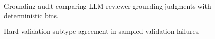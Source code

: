 \begin{table}[h]
\centering
\caption{Grounding audit comparing LLM reviewer grounding judgments with
deterministic bins.}
\small

\end{table}

\begin{table}[h]
\centering
\caption{Hard-validation subtype agreement in sampled validation failures.}
\small

\end{table}
